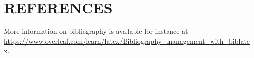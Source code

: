 \section*{REFERENCES}
\printbibliography[heading=none]

\noindent More information on bibliography is available for instance at \url{https://www.overleaf.com/learn/latex/Bibliography_management_with_biblatex}.


